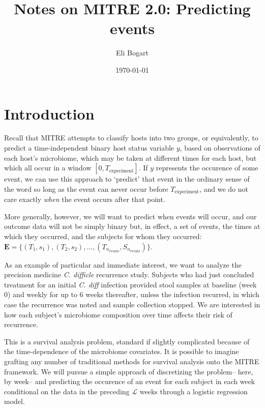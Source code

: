 \documentclass[12pt]{article}
\title{Notes on MITRE 2.0: Predicting events}
\author{Eli Bogart}
\date{\today}
\begin{document}
\maketitle
{} 
\section{Introduction}
Recall that MITRE attempts to classify hosts into two groups, or
equivalently, to predict a time-independent binary host status
variable $y$, based on observations of each host's microbiome, which
may be taken at different times for each host, but which all occur in
a window $[0,T_\text{experiment}]$. If $y$ represents the occurence of
some event, we can use this approach to `predict' that event in the
ordinary sense of the word so long as the event can never occur before
$T_\text{experiment}$, and we do not care exactly \textit{when} the
event occurs after that point.

More generally, however, we will want to predict when events will
occur, and our outcome data will not be simply binary but, in effect,
a set of events, the times at which they occurred, and the subjects
for whom they occurred: $\mathbf E = \{(T_1, s_1), (T_2, s_2), \ldots,
(T_{n_\text{events}}, S_{n_\text{events}})\}$.

As an example of particular and immediate interest, we want to analyze
the precision medicine \textit{C. difficle} recurrence study. Subjects
who had just concluded treatment for an initial \textit{C. diff}
infection provided stool samples at baseline (week 0) and weekly for
up to 6 weeks thereafter, unless the infection recurred, in which case
the recurrence was noted and sample collection stopped. We are
interested in how each subject's microbiome composition over time
affects their risk of recurrence.

This is a survival analysis problem, standard if slightly complicated
because of the time-dependence of the microbiome covariates. It is
possible to imagine grafting any number of traditional methods for
survival analysis onto the MITRE framework. We will pursue a simple
approach of discretizing the problem-- here, by week-- and predicting
the occurence of an event for each subject in each week conditional on
the data in the preceding $\mathcal L$ weeks through a logistic
regression model.
\end{document}
